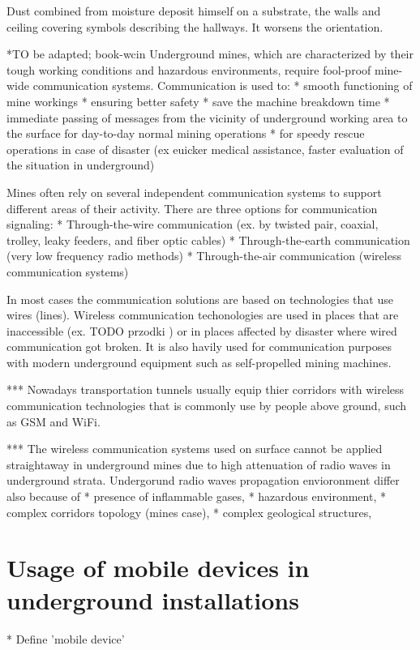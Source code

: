 \documentclass[../main.tex]{subfiles}
\begin{document}
Dust combined from moisture deposit himself on a substrate, the walls and ceiling covering symbols describing the hallways. It worsens the orientation.

*TO be adapted; book-wcin
Underground mines, which are characterized by their tough working conditions and hazardous environments, require fool-proof mine-wide communication systems. Communication is used to:
* smooth functioning of mine workings
* ensuring better safety
* save the machine breakdown time
* immediate passing of messages from the vicinity of underground working area to the surface for day-to-day normal mining operations
* for speedy rescue operations in case of disaster (ex euicker medical assistance, faster evaluation of the situation in underground)

Mines often rely on several independent communication systems to support different areas of their activity. There are three options for communication signaling:
* Through-the-wire communication (ex. by twisted pair, coaxial, trolley, leaky feeders, and fiber optic cables)
* Through-the-earth communication (very low frequency radio methods)
* Through-the-air communication (wireless communication systems)

In most cases the communication solutions are based on technologies that use wires (lines). Wireless communication techonologies are used in places that are inaccessible (ex. TODO przodki ) or in places affected by disaster where wired communication got broken. It is also havily used for communication purposes with modern underground equipment such as self-propelled mining machines.

***
Nowadays transportation tunnels usually equip thier corridors with wireless communication technologies that is commonly use by people above ground, such as GSM and WiFi.

***
The wireless communication systems used on surface cannot be applied straightaway in underground mines due to high attenuation of radio waves in underground strata. Undergorund radio waves propagation envioronment differ also because of
* presence of inflammable gases,
* hazardous environment,
* complex corridors topology (mines case),
* complex geological structures,





\section{Usage of mobile devices in underground installations}
* Define 'mobile device'
\end{document}
